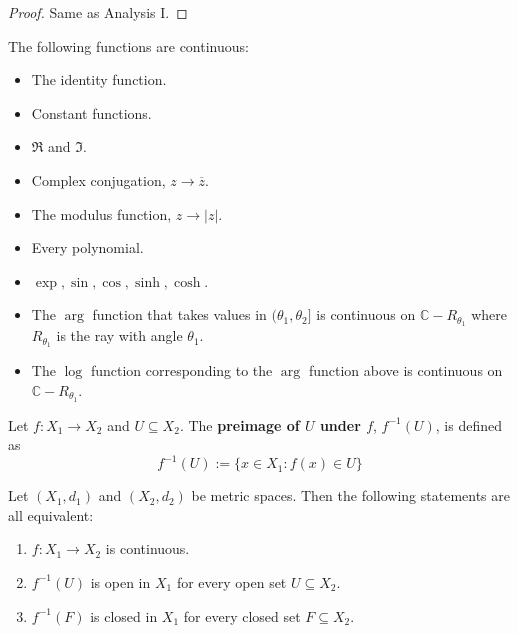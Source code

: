 \begin{proof}
	Same as Analysis I.
\end{proof}

\begin{example}
	The following functions are continuous:
	\begin{itemize}
		\item The identity function.
		\item Constant functions.
		\item $\Re$ and $\Im$.
		\item Complex conjugation, $z \rightarrow \overline{z}$.
		\item The modulus function, $z \rightarrow |z|$.
		\item Every polynomial.
		\item $\exp, \sin, \cos, \sinh, \cosh$.
		\item The $\arg$ function that takes values in $(\theta_1, \theta_2]$ is continuous on $\mathbb{C} - R_{\theta_1}$ where $R_{\theta_1}$ is the ray with angle $\theta_1$.
		\item The $\log$ function corresponding to the $\arg$ function above is continuous on $\mathbb{C} - R_{\theta_1}$.
	\end{itemize}
\end{example}

\begin{definition}
	Let $f: X_1 \rightarrow X_2$ and $U \subseteq X_2$. The \textbf{preimage of $U$ under $f$}, $f^{-1}(U)$, is defined as
	\[
		f^{-1}(U) := \{ x \in X_1: f(x) \in U \}
	\]
\end{definition}

\begin{theorem}\label{thm:continuityViaOpenSets}
	Let $(X_1, d_1)$ and $(X_2, d_2)$ be metric spaces. Then the following statements are all equivalent:
	\begin{enumerate}
		\item $f: X_1 \rightarrow X_2$ is continuous.
		\item $f^{-1}(U)$ is open in $X_1$ for every open set $U \subseteq X_2$.
		\item $f^{-1}(F)$ is closed in $X_1$ for every closed set $F \subseteq X_2$.
	\end{enumerate}
\end{theorem}

